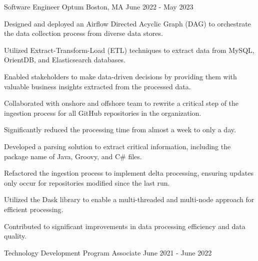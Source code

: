 

\begin{cventries}

  \cventry
    {Software Engineer} %
    {Optum} %
    {Boston, MA} %
    {June 2022 - May 2023} %
    {
      \begin{cvitems} %
        \item {Designed and deployed an Airflow Directed Acyclic Graph (DAG) to orchestrate the data collection process from diverse data stores.}
        \item {Utilized Extract-Transform-Load (ETL) techniques to extract data from MySQL, OrientDB, and Elasticsearch databases.}
        \item {Enabled stakeholders to make data-driven decisions by providing them with valuable business insights extracted from the processed data.}
        \item {Collaborated with onshore and offshore team to rewrite a critical step of the ingestion process for all GitHub repositories in the organization.}
        \item {Significantly reduced the processing time from almost a week to only a day.}
        \item {Developed a parsing solution to extract critical information, including the package name of Java, Groovy, and C\# files.}
        \item {Refactored the ingestion process to implement delta processing, ensuring updates only occur for repositories modified since the last run.}
        \item {Utilized the Dask library to enable a multi-threaded and multi-node approach for efficient processing.}
        \item {Contributed to significant improvements in data processing efficiency and data quality.}
      \end{cvitems}
    }
  \cventry
    {Technology Development Program Associate} %
    {} %
    {} %
    {June 2021 - June 2022} %

\end{cventries}
